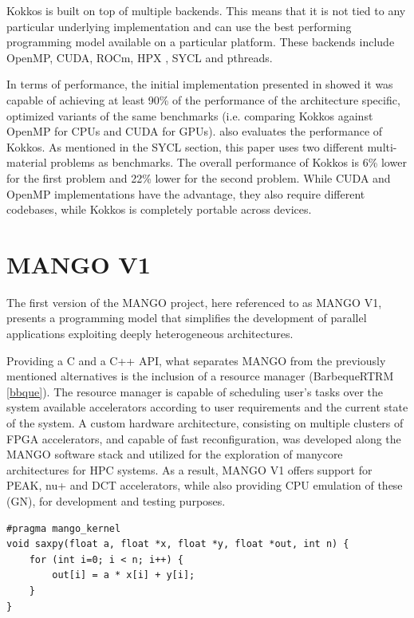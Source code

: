Kokkos is built on top of multiple backends. This means that it is not tied to any particular underlying implementation and can use the best performing programming model available on a particular platform. These backends include OpenMP, CUDA, ROCm, HPX \cite{hpx}, SYCL and pthreads.

In terms of performance, the initial implementation presented in \cite{kokkos} showed it was capable of achieving at least 90\% of the performance of the architecture specific, optimized variants of the same benchmarks (i.e. comparing Kokkos against OpenMP for CPUs and CUDA for GPUs). \cite{performance_portability_multimaterial_kernels} also evaluates the performance of Kokkos. As mentioned in the SYCL section, this paper uses two different multi-material problems as benchmarks. The overall performance of Kokkos is 6\% lower for the first problem and 22\% lower for the second problem. While CUDA and OpenMP implementations have the advantage, they also require different codebases, while Kokkos is completely portable across devices.


\section{MANGO V1} \label{sect:mangov1}
The first version of the MANGO project, here referenced to as MANGO V1, presents a programming model that simplifies the development of parallel applications exploiting deeply heterogeneous architectures. 

Providing a C and a C++ API, what separates MANGO from the previously mentioned alternatives is the inclusion of a resource manager (BarbequeRTRM \ref{bbque}). The resource manager is capable of scheduling user's tasks over the system available accelerators according to user requirements and the current state of the system. 
A custom hardware architecture, consisting on multiple clusters of FPGA accelerators, and capable of fast reconfiguration, was developed along the MANGO software stack and utilized for the exploration of manycore architectures for HPC systems.
As a result, MANGO V1 offers support for PEAK, nu+ and DCT accelerators, while also providing CPU emulation of these (GN), for development and testing purposes.

\begin{lstlisting}[style=CStyle, caption=MANGO GN saxpy example (kernel), floatplacement=H, label={lst:mangov1_kernel_sample}]
#pragma mango_kernel
void saxpy(float a, float *x, float *y, float *out, int n) {
    for (int i=0; i < n; i++) {
	    out[i] = a * x[i] + y[i];
    }
}
\end{lstlisting}

